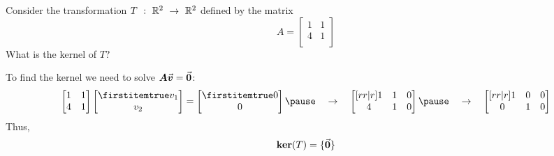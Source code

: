 \documentclass{beamer}
\begin{document}
\begin{frame}
\begin{example}
Consider the transformation $T\ :\ \mathbb{R}^2\ \rightarrow\ \mathbb{R}^2$ defined by the matrix
\begin{equation*}A=
\begin{bmatrix}
1 & 1 \\
4 & 1 \\
\end{bmatrix}
\end{equation*}
What is the kernel of $T$?\pause

\vspace{2mm}
To find the kernel we need to solve $\boldsymbol{A}{\vec{\boldsymbol{v}}}={\vec{\boldsymbol{0}}}$:
\begin{equation*}
\begin{bmatrix}
1 & 1 \\
4 & 1 \\
\end{bmatrix}
\bvector{v_1,v_2}=\bvector{0,0}
\pause\quad\rightarrow\quad
\begin{bmatrix}[rr|r]
1 & 1 & 0 \\
4 & 1 & 0 \\
\end{bmatrix}
\pause\quad\rightarrow\quad
\begin{bmatrix}[rr|r]
1 & 0 & 0 \\
0 & 1 & 0 \\
\end{bmatrix}
\end{equation*}\pause
Thus,
\begin{equation*}
\operatorname{\textbf{ker}}(T)=\{{\vec{\boldsymbol{0}}}\}
\end{equation*}
\end{example}
\end{frame}
\end{document}
